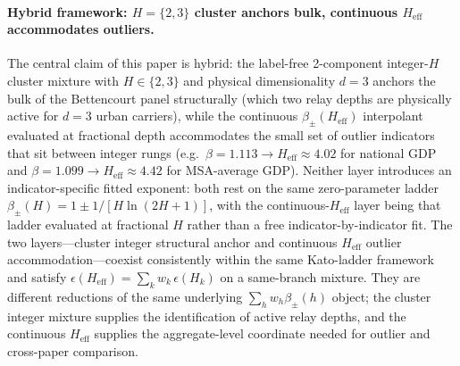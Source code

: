 \paragraph{Hybrid framework: \(H{=}\{2,3\}\) cluster anchors bulk, continuous \(H_{\mathrm{eff}}\) accommodates outliers.}
The central claim of this paper is hybrid: the label-free 2-component
integer-\(H\) cluster mixture with \(H\in\{2,3\}\) and physical
dimensionality \(d=3\) anchors the bulk of the Bettencourt panel
structurally (which two relay depths are physically active for $d{=}3$
urban carriers), while the continuous \(\beta_{\pm}(H_{\mathrm{eff}})\)
interpolant evaluated at fractional depth accommodates the small set of
outlier indicators that sit between integer rungs (e.g.\
\(\beta=1.113\to H_{\mathrm{eff}}\approx 4.02\) for national GDP and
\(\beta=1.099\to H_{\mathrm{eff}}\approx 4.42\) for MSA-average GDP).
Neither layer introduces an indicator-specific fitted exponent: both rest
on the same zero-parameter ladder \(\beta_{\pm}(H)=1\pm 1/[H\ln(2H+1)]\),
with the continuous-\(H_{\mathrm{eff}}\) layer being that ladder
evaluated at fractional \(H\) rather than a free indicator-by-indicator
fit. The two layers---cluster integer structural anchor and continuous
\(H_{\mathrm{eff}}\) outlier accommodation---coexist consistently within
the same Kato-ladder framework and satisfy
\(\epsilon(H_{\mathrm{eff}})=\sum_k w_k\,\epsilon(H_k)\) on a same-branch
mixture. They are different reductions of the same underlying
\(\sum_h w_h\beta_{\pm}(h)\) object; the cluster integer mixture supplies
the identification of active relay depths, and the continuous
\(H_{\mathrm{eff}}\) supplies the aggregate-level coordinate needed for
outlier and cross-paper comparison.

